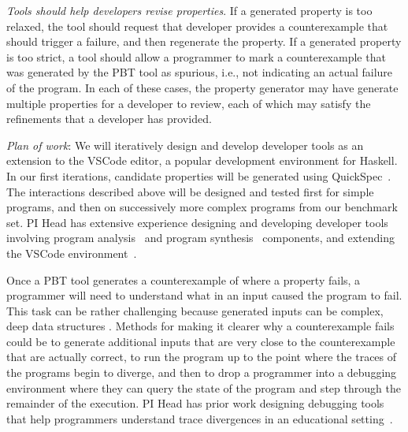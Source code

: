 \textit{Tools should help developers \emph{revise} properties}. If a generated property is too relaxed, the tool should request that developer provides a counterexample that should trigger a failure, and then regenerate the property. If a generated property is too strict, a tool should allow a programmer to mark a counterexample that was generated by the PBT tool as spurious, i.e., not indicating an actual failure of the program. In each of these cases, the property generator may have generate multiple properties for a developer to review, each of which may satisfy the refinements that a developer has provided.

\textit{Plan of work}: We will iteratively design and develop developer tools as an extension to the VSCode editor, a popular development environment for Haskell. In our first iterations, candidate properties will be generated using QuickSpec~\cite{claessen2010quickspec}. The interactions described above will be designed and tested first for simple programs, and then on successively more complex programs from our benchmark set. PI Head has extensive experience designing and developing developer tools involving program analysis~\cite{head2018interactive,head2019managing} and program synthesis~\cite{head2017writing} components, and extending the VSCode environment~\cite{head2020composing}.   


Once a PBT tool generates a counterexample of where a property fails, a programmer will need to understand what in an input caused the program to fail. This task can be rather challenging because generated inputs can be complex, deep data structures . Methods for making it clearer why a counterexample fails could be to generate additional inputs that are very close to the counterexample that are actually correct, to run the program up to the point where the traces of the programs begin to diverge, and then to drop a programmer into a debugging environment where they can query the state of the program and step through the remainder of the execution. PI Head has prior work designing debugging tools that help programmers understand trace divergences in an educational setting~\cite{suzuki2017tracediff}.   

